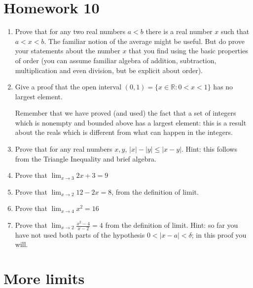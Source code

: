 \documentclass[12pt]{article}
\begin{document}
\newpage

\section{Homework 10}

\begin{enumerate}

\item  Prove that for any two real numbers $a<b$ there is a real number $x$ such that $a<x<b$.  The familiar notion of the average might be useful.  But do prove your statements about the number $x$ that you find using the basic properties of order (you can assume familiar algebra of addition, subtraction, multiplication and even division, but be explicit about order).

\item  Give a proof that the open interval $(0,1) = \{x \in {\mathbb R}:0<x<1\}$ has no largest element.

Remember that we have proved (and used) the fact that a set of integers which is nonempty and bounded above has a largest element:  this is a result about the reals which is different from what can happen in the integers.

\item  Prove that for any real numbers $x,y$, $|x| - |y| \leq |x-y|$.  Hint:  this follows from the Triangle Inequality and brief algebra.

\item Prove that $\lim_{x \rightarrow 3}2x+3 = 9$

\item  Prove that $\lim_{x \rightarrow 2}12-2x = 8$, from the definition of limit.

\item Prove that $\lim_{x \rightarrow 4}x^2 = 16$

\item  Prove that $\lim_{x \rightarrow 2}\frac{x^2-4}{x-2} = 4$ from the definition of limit.
Hint:  so far you have not used both parts of the hypothesis $0<|x-a|<\delta$;  in this proof you will.

\end{enumerate}

\section{More limits}
\end{document}
